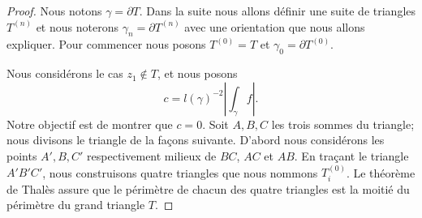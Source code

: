 \begin{proof}
    Nous notons \( \gamma=\partial T\). Dans la suite nous allons définir une suite de triangles \( T^{(n)}\) et nous noterons \( \gamma_n=\partial T^{(n)}\) avec une orientation que nous allons expliquer. Pour commencer nous posons \( T^{(0)}=T\) et \( \gamma_0=\partial T^{(0)}\).

    Nous considérons le cas \( z_1\notin T\), et nous posons
    \begin{equation}
        c=l(\gamma)^{-2}| \int_{\gamma}f |.
    \end{equation}
    Notre objectif est de montrer que \( c=0\). Soit \( A,B,C\) les trois sommes du triangle; nous divisons le triangle de la façons suivante. D'abord nous considérons les points \( A',B,C'\) respectivement milieux de \( BC\), \( AC\) et \( AB\). En traçant le triangle \( A'B'C'\), nous construisons quatre triangles que nous nommons \( T^{(0)}_i\). Le théorème de Thalès assure que le périmètre de chacun des quatre triangles est la moitié du périmètre du grand triangle \( T\).


\end{proof}
